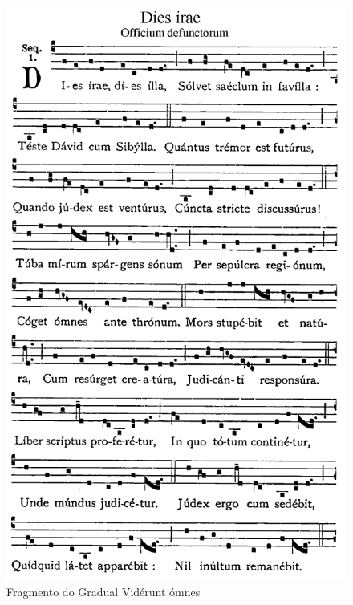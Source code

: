 \documentclass[spanish, a4paper,nobind]{templates/ociamthesis}
\newcommand*{\bibtitle}{Works Cited}
\begin{document}
\begin{figure}[h]

{\centering \includegraphics[width=1\linewidth]{figures/ud-03/Dies-irae} 

}

\caption[Vidérunt ómnes]{Fragmento do Gradual Vidérunt ómnes}\label{fig:Viderunt-omnes}
\end{figure}



\setlength{\baselineskip}{0pt} %

{\renewcommand*\MakeUppercase[1]{#1}%
\printbibliography[heading=bibintoc,title={\bibtitle}]}
\end{document}
